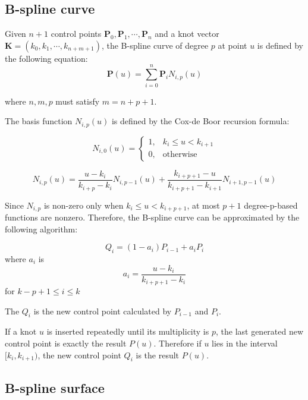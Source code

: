 \documentclass[acmtog]{acmart}
\begin{document}
\subsection{B-spline curve}

Given $n+1$ control points $\bm{P}_0, \bm{P}_1, \cdots, \bm{P}_n$ and a knot vector $\bm{K} = (k_0, k_1, \cdots, k_{n+m+1})$, the B-spline curve of degree $p$ at point $u$ is defined by the following equation:
\begin{equation}
	\bm{P}(u) = \sum_{i=0}^{n} \bm{P}_i N_{i,p}(u)
\end{equation}

where $n, m, p$ must satisfy $m = n + p + 1$.

The basis function $N_{i,p}(u)$ is defined by the Cox-de Boor recursion formula:

\begin{equation}
	N_{i,0}(u) = \begin{cases}
		1, & k_i \leq u < k_{i+1} \\
		0, & \text{otherwise}
	\end{cases}			
\end{equation}

\begin{equation}
	N_{i,p}(u) = \frac{u-k_i}{k_{i+p}-k_i}N_{i,p-1}(u) + \frac{k_{i+p+1}-u}{k_{i+p+1}-k_{i+1}}N_{i+1,p-1}(u)
\end{equation}

Since $N_{i,p}$ is non-zero only when $k_i \leq u < k_{i+p+1}$, at most $p+1$ degree-p-based functions are nonzero. Therefore, the B-spline curve can be approximated by the following algorithm:

\[
	Q_i = (1-a_i) P_{i-1} + a_i P_i	
\]
where $a_i$ is \[
	a_i = \frac{u-k_i}{k_{i+p+1}-k_i} 	
\] for $k-p+1\leq i \leq k$

The $Q_i$ is the new control point calculated by $P_{i-1}$ and $P_i$. 







If a knot $u$ is inserted repeatedly until its multiplicity is $p$, the last generated new control point is exactly the result $P(u)$. Therefore if $u$ lies in the interval $[k_i, k_{i+1})$, the new control point $Q_i$ is the result $P(u)$.



\subsection{B-spline surface}
\end{document}
